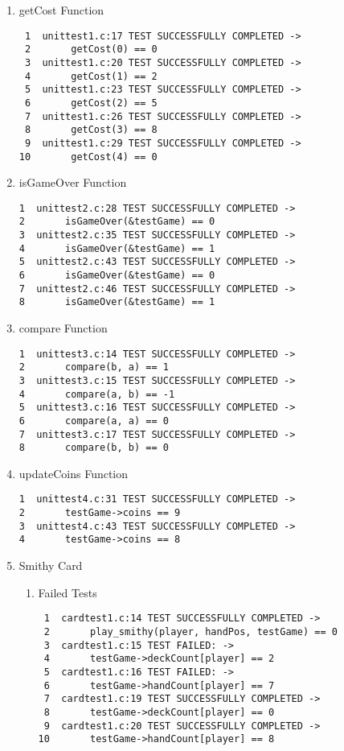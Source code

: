 \documentclass[11pt]{article}
\begin{document}
\begin{enumerate}
\item getCost Function
\label{sec:getcostfunction}
\begin{verbatim}
 1  unittest1.c:17 TEST SUCCESSFULLY COMPLETED ->
 2       getCost(0) == 0
 3  unittest1.c:20 TEST SUCCESSFULLY COMPLETED ->
 4       getCost(1) == 2
 5  unittest1.c:23 TEST SUCCESSFULLY COMPLETED ->
 6       getCost(2) == 5
 7  unittest1.c:26 TEST SUCCESSFULLY COMPLETED ->
 8       getCost(3) == 8
 9  unittest1.c:29 TEST SUCCESSFULLY COMPLETED ->
10       getCost(4) == 0
\end{verbatim}

\item isGameOver Function
\label{sec:isgameoverfunction}
\begin{verbatim}
1  unittest2.c:28 TEST SUCCESSFULLY COMPLETED ->
2       isGameOver(&testGame) == 0
3  unittest2.c:35 TEST SUCCESSFULLY COMPLETED ->
4       isGameOver(&testGame) == 1
5  unittest2.c:43 TEST SUCCESSFULLY COMPLETED ->
6       isGameOver(&testGame) == 0
7  unittest2.c:46 TEST SUCCESSFULLY COMPLETED ->
8       isGameOver(&testGame) == 1
\end{verbatim}

\item compare Function
\label{sec:comparefunction}
\begin{verbatim}
1  unittest3.c:14 TEST SUCCESSFULLY COMPLETED ->
2       compare(b, a) == 1
3  unittest3.c:15 TEST SUCCESSFULLY COMPLETED ->
4       compare(a, b) == -1
5  unittest3.c:16 TEST SUCCESSFULLY COMPLETED ->
6       compare(a, a) == 0
7  unittest3.c:17 TEST SUCCESSFULLY COMPLETED ->
8       compare(b, b) == 0
\end{verbatim}

\item updateCoins Function
\label{sec:updatecoinsfunction}
\begin{verbatim}
1  unittest4.c:31 TEST SUCCESSFULLY COMPLETED ->
2       testGame->coins == 9
3  unittest4.c:43 TEST SUCCESSFULLY COMPLETED ->
4       testGame->coins == 8
\end{verbatim}

\item Smithy Card
\label{sec:smithycard}

\begin{enumerate}
\item Failed Tests
\label{sec:failedtests}

\begin{verbatim}
 1  cardtest1.c:14 TEST SUCCESSFULLY COMPLETED ->
 2       play_smithy(player, handPos, testGame) == 0
 3  cardtest1.c:15 TEST FAILED: ->
 4       testGame->deckCount[player] == 2
 5  cardtest1.c:16 TEST FAILED: ->
 6       testGame->handCount[player] == 7
 7  cardtest1.c:19 TEST SUCCESSFULLY COMPLETED ->
 8       testGame->deckCount[player] == 0
 9  cardtest1.c:20 TEST SUCCESSFULLY COMPLETED ->
10       testGame->handCount[player] == 8
\end{verbatim}



\end{enumerate}
\end{enumerate}
\end{document}

